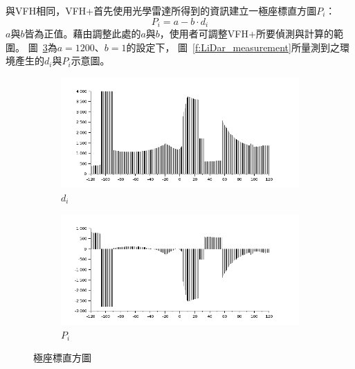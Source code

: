 與VFH相同，VFH+首先使用光學雷達所得到的資訊建立一極座標直方圖$P_i$：
\begin{equation}
	P_i = a - b\cdot d_i
\end{equation}
$a$與$b$皆為正值。藉由調整此處的$a$與$b$，使用者可調整VFH+所要偵測與計算的範圍。
圖~\ref{f:polar_histogram}為$a=1200$、$b=1$的設定下，
圖~\ref{f:LiDar_measurement}所量測到之環境產生的$d_i$與$P_i$示意圖。
\begin{figure}[h!]
	\centering
	\begin{subfigure}[b]{0.7\textwidth}
		\includegraphics[width=\textwidth]{figures/polar_histogram}
		\caption{$d_i$}
		\label{f:polar_histogram_original}
	\end{subfigure}
	\begin{subfigure}[b]{0.7\textwidth}
		\includegraphics[width=\textwidth]{figures/polar_histogram_modified}
		\caption{$P_i$}
		\label{f:polar_histogram_modified}
	\end{subfigure}
	\caption{極座標直方圖}
	\label{f:polar_histogram}
\end{figure}

